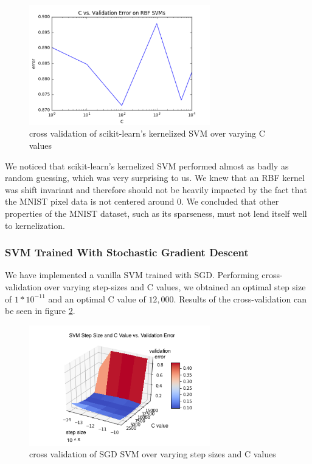 \documentclass{article} %
\begin{document}
\begin{figure}[h]
\centering
\includegraphics[width=0.7\textwidth]{sklearn-svm-kernel-c-cv.png}
\caption{cross validation of scikit-learn's kernelized SVM over varying C values}
\label{fig:sklearn-svm-kernel-c-cv}
\end{figure}

We noticed that scikit-learn's kernelized SVM performed almost as badly as
random guessing, which was very surprising to us. We knew that an RBF kernel was
shift invariant and therefore should not be heavily impacted by the fact that
the MNIST pixel data is not centered around 0. We concluded that other
properties of the MNIST dataset, such as its sparseness, must not lend itself
well to kernelization.

\subsubsection{SVM Trained With Stochastic Gradient Descent}
We have implemented a vanilla SVM trained with SGD. Performing cross-validation
over varying step-sizes and C values, we obtained an optimal step size of $1 *
10^{-11}$ and an optimal C value of $12,000$. Results of the cross-validation
can be seen in figure \ref{fig:svm-step-C-cv}.

\begin{figure}[h]
\centering
\includegraphics[width=0.7\textwidth]{svm-step-C-cv.png}
\caption{cross validation of SGD SVM over varying step sizes and C values}
\label{fig:svm-step-C-cv}
\end{figure}
\end{document}
